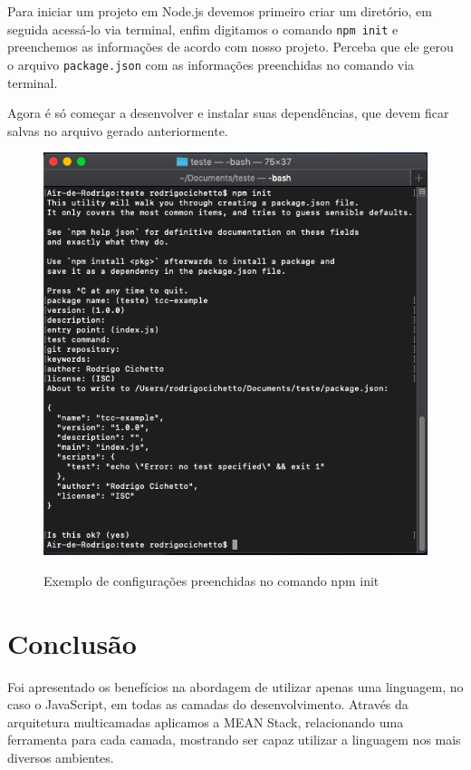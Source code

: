 \documentclass[
	12pt,				%
	openright,			%
	twoside,			%
	a4paper,			%
	english,			%
	brazil				%
	]{abntex2}
\begin{document}
Para iniciar um projeto em Node.js devemos primeiro criar um diretório, em seguida acessá-lo via terminal, enfim digitamos o comando \verb|npm init| e preenchemos as informações de acordo com nosso projeto. Perceba que ele gerou o arquivo \verb|package.json| com as informações preenchidas no comando via terminal.

Agora é só começar a desenvolver e instalar suas dependências, que devem ficar salvas no arquivo gerado anteriormente.

\begin{figure}[h]
	\centering

  \caption{Exemplo de configurações preenchidas no comando npm init} \label{fig:NpmInitExample}
    \includegraphics[scale=0.5]{npm-init-example} \\

\end{figure}

\chapter{Conclusão}
Foi apresentado os benefícios na abordagem de utilizar apenas uma linguagem, no caso o JavaScript, em todas as camadas do desenvolvimento. Através da arquitetura multicamadas aplicamos a MEAN Stack, relacionando uma ferramenta para cada camada, mostrando ser capaz utilizar a linguagem nos mais diversos ambientes.
\end{document}
